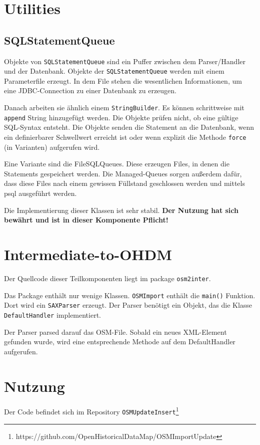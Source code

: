 \section{Utilities}
\subsection{SQLStatementQueue}
\label{SQLStatementQueue}
Objekte von {\tt SQLStatementQueue} sind ein Puffer zwischen dem Parser/Handler und
der Datenbank. Objekte der {\tt SQLStatementQueue} werden mit einem Parameterfile erzeugt.
In dem File stehen die wesentlichen Informationen, um eine JDBC-Connection zu einer Datenbank
zu erzeugen.

Danach arbeiten sie ähnlich einem {\tt StringBuilder}. Es können schrittweise mit {\tt append}
String hinzugefügt werden. Die Objekte prüfen nicht, ob eine gültige SQL-Syntax entsteht.
Die Objekte senden die Statement an die Datenbank, wenn ein definierbarer Schwellwert erreicht
ist oder wenn explizit die Methode {\tt force} (in Varianten) aufgerufen wird.

Eine Variante sind die FileSQLQueues. Diese erzeugen Files, in denen die Statements gespeichert
werden. Die Managed-Queues sorgen außerdem dafür, dass diese Files nach einem gewissen Füllstand
geschlossen werden und mittels psql ausgeführt werden. 

Die Implementierung dieser Klassen ist sehr stabil. {\bf Der Nutzung hat sich bewährt und ist in
dieser Komponente Pflicht!}

\section{Intermediate-to-OHDM}
Der Quellcode dieser Teilkomponenten liegt im package {\tt osm2inter}.

Das Package enthält nur wenige Klassen. {\tt OSMImport} enthält die {\tt main()}
Funktion. Dort wird ein {\tt SAXParser} erzeugt. Der Parser benötigt ein
Objekt, das die Klasse {\tt DefaultHandler} implementiert.

Der Parser parsed darauf das OSM-File. Sobald ein neues XML-Element gefunden wurde,
wird eine entsprechende Methode auf dem DefaultHandler aufgerufen. 

\section{Nutzung}
Der Code befindet sich im Repository {\tt OSMUpdateInsert}\footnote{https://github.com/OpenHistoricalDataMap/OSMImportUpdate}
